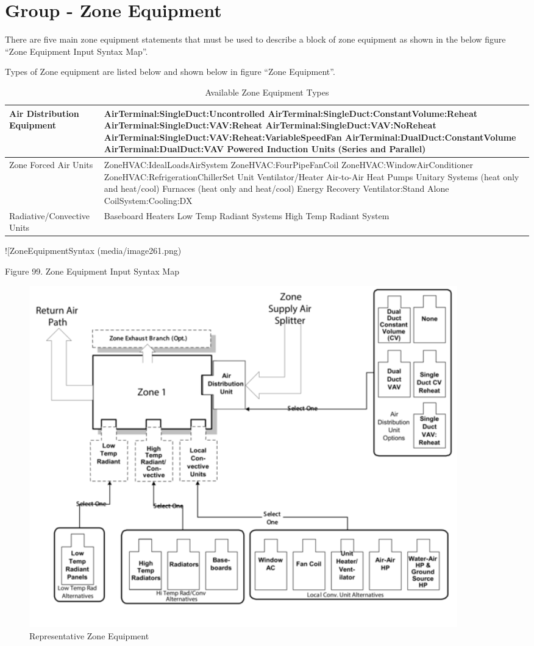\section{Group - Zone Equipment}\label{group---zone-equipment}

There are five main zone equipment statements that must be used to describe a block of zone equipment as shown in the below figure ``Zone Equipment Input Syntax Map''.

Types of Zone equipment are listed below and shown below in figure ``Zone Equipment''.

\begin{longtable}[c]{p{1.5in}p{4.5in}}
\caption{Available Zone Equipment Types \protect \label{table:available-zone-equipment-types}}\\
\toprule 
Air Distribution Equipment & AirTerminal:SingleDuct:Uncontrolled    AirTerminal:SingleDuct:ConstantVolume:Reheat    AirTerminal:SingleDuct:VAV:Reheat    AirTerminal:SingleDuct:VAV:NoReheat    AirTerminal:SingleDuct:VAV:Reheat:VariableSpeedFan    AirTerminal:DualDuct:ConstantVolume    AirTerminal:DualDuct:VAV    Powered Induction Units (Series and Parallel) \tabularnewline \midrule
\endhead
Zone Forced Air Units ~ & ZoneHVAC:IdealLoadsAirSystem    ZoneHVAC:FourPipeFanCoil    ZoneHVAC:WindowAirConditioner    ZoneHVAC:RefrigerationChillerSet    Unit Ventilator/Heater    Air-to-Air Heat Pumps    Unitary Systems (heat only and heat/cool)    Furnaces (heat only and heat/cool)    Energy Recovery Ventilator:Stand Alone    CoilSystem:Cooling:DX \tabularnewline
Radiative/Convective Units & Baseboard Heaters    Low Temp Radiant Systems    High Temp Radiant System \tabularnewline
\bottomrule
\end{longtable}

!{[}ZoneEquipmentSyntax (media/image261.png)

Figure 99. Zone Equipment Input Syntax Map

\begin{figure}[hbtp] %
\centering
\includegraphics[width=0.9\textwidth, height=0.9\textheight, keepaspectratio=true]{media/image262.png}
\caption{Representative Zone Equipment \protect \label{fig:representative-zone-equipment}}
\end{figure}


